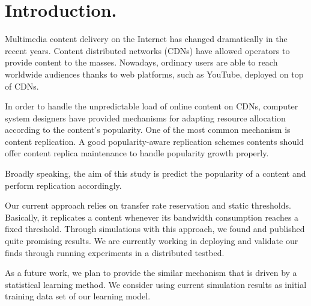 	\section{Introduction.}

		Multimedia content delivery on the Internet has changed dramatically in the recent
		years. Content distributed networks (CDNs) have allowed operators to
		provide content to the masses. Nowadays, ordinary users are able to 
		reach worldwide audiences thanks to web platforms, such as YouTube, deployed on top of CDNs.

		In order to handle the unpredictable load of online content on CDNs, computer system designers have provided
		mechanisms for adapting resource allocation according to the content's popularity.
		One of the most common mechanism is content replication.
		A good popularity-aware replication schemes contents should offer content replica 	
		maintenance to handle popularity growth properly.

		Broadly speaking, the aim of this study is predict the popularity of a content and
		perform replication accordingly. 

		Our current approach relies on transfer rate reservation and static thresholds. 
		Basically, it replicates a content whenever its bandwidth consumption reaches a fixed
		threshold. Through simulations with this approach, we found and published quite promising results. We are currently working in deploying and validate our finds through
		running experiments in a distributed testbed.
 
		As a future work, we plan to provide the similar mechanism that is driven by a statistical learning method. We consider using current simulation results as initial training data set of our learning model. 
 

